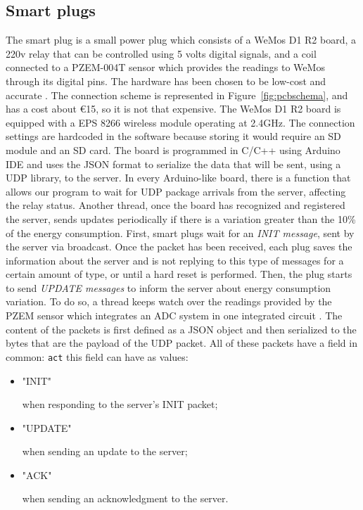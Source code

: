 \documentclass[conference]{IEEEtran}
\begin{document}
\subsection{Smart plugs}\label{SP}
The smart plug is a small power plug which consists of a WeMos D1 R2 board, a 220v relay that can be controlled using 5 volts digital signals, and a coil connected to a PZEM-004T sensor which provides the readings to WeMos through its digital pins. The hardware has been chosen to be low-cost and accurate \cite{8442066}.
The connection scheme is represented in Figure~\ref{fig:pcbschema}, and has a cost about €15, so it is not that expensive. 
The WeMos D1 R2 board is equipped with a EPS 8266 wireless module operating at 2.4GHz. The connection settings are hardcoded in the software because storing it would require an SD module and an SD card. The board is programmed in C/C++ using Arduino IDE and uses the JSON format to serialize the data that will be sent, using a UDP library, to the server.
In every Arduino-like board, there is a function that allows our program to wait for UDP package arrivals from the server, affecting the relay status.
Another thread, once the board has recognized and registered the server, sends updates periodically if there is a variation greater than the 10\% of the energy consumption.
First, smart plugs wait for an \textit{INIT message}, sent by the server via broadcast. Once the packet has been received, each plug saves the information about the server and is not replying to this type of messages for a certain amount of type, or until a hard reset is performed. 
Then, the plug starts to send \textit{UPDATE messages} to inform the server about energy consumption variation. To do so, a thread keeps watch over the readings provided by the PZEM sensor \cite{8442052}\cite{8250475} which integrates an ADC  system  in  one integrated circuit \cite{8612412}.
The content of the packets is first defined as a JSON object and then serialized to the bytes that are the payload of the UDP packet. All of these packets have a field in common: \verb|act| this field can have as values:
\begin{itemize}
	\item \begin{spverbatim}"INIT"\end{spverbatim} when responding to the server's INIT packet;
	\item \begin{spverbatim}"UPDATE"\end{spverbatim} when sending an update to the server;
	\item \begin{spverbatim}"ACK"\end{spverbatim} when sending an acknowledgment to the server.
\end{itemize}
\end{document}
